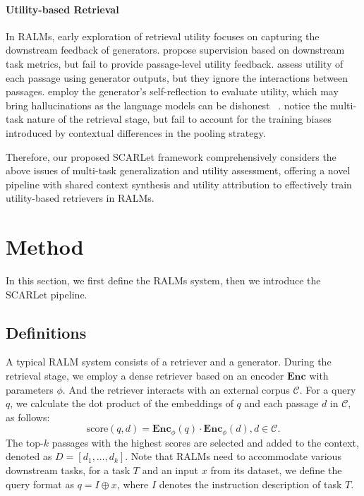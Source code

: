 \documentclass[11pt]{article}
\begin{document}
\paragraph{Utility-based Retrieval} In RALMs, early exploration of retrieval utility focuses on capturing the downstream feedback of generators. \citet{towardsasearchengineformachines} propose supervision based on downstream task metrics, but fail to provide passage-level utility feedback. \citet{replug, aar} assess utility of each passage using generator outputs, but they ignore the interactions between passages. \citet{sohn2024rationaleguidedretrievalaugmentedgeneration, wei2024instructrag} employ the generator's self-reflection to evaluate utility, which may bring hallucinations as the language models can be dishonest ~\citep{madsen-etal-2024-self}. \citet{tart, glass-etal-2022-re2g} notice the multi-task nature of the retrieval stage, but fail to account for the training biases introduced by contextual differences in the pooling strategy.

Therefore, our proposed SCARLet framework comprehensively considers the above issues of multi-task generalization and utility assessment, offering a novel pipeline with shared context synthesis and utility attribution to effectively train utility-based retrievers in RALMs.






\section{Method}

In this section, we first define the RALMs system, then we introduce the SCARLet pipeline.


\subsection{Definitions}
\label{sec:3-1}


A typical RALM system consists of a retriever and a generator. During the retrieval stage, we employ a dense retriever based on an encoder $\mathbf{Enc}$ with parameters $\phi$. And the retriever interacts with an external corpus $\mathcal{C}$. For a query $q$, we calculate the dot product of the embeddings of $q$ and each passage $d$ in $\mathcal{C}$, as follows:
\begin{equation}
    \mathrm{score}\left ( q,d \right ) = \mathbf{Enc}_{\phi} \left ( q \right ) \cdot \mathbf{Enc}_{\phi} \left ( d \right ), d \in \mathcal{C}.
\end{equation}
The top-$k$ passages with the highest scores are selected and added to the context, denoted as $D = \left [d_1,\dots,d_k \right]$. Note that RALMs need to accommodate various downstream tasks, for a task $T$ and an input $x$ from its dataset, we define the query format as $q=I \oplus x$, where $I$ denotes the instruction description of task $T$. 
\end{document}
